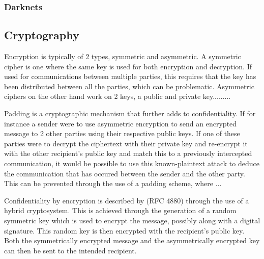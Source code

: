 		\subsubsection*{Darknets}
	\subsection{Cryptography}
		Encryption is typically of 2 types, symmetric and asymmetric. A symmetric cipher is one where the same key is used for both encryption and decryption. If used for communications between multiple parties, this requires that the key has been distributed between all the parties, which can be problematic. Asymmetric ciphers on the other hand work on 2 keys, a public and private key.........
		
		Padding is a cryptographic mechanism that further adds to confidentiality. If for instance a sender were to use asymmetric encryption to send an encrypted message to 2 other parties using their respective public keys. If one of these parties were to decrypt the ciphertext with their private key and re-encrypt it with the other recipient's public key and match this to a previously intercepted communication, it would be possible to use this known-plaintext attack to deduce the communication that has occured between the sender and the other party. This can be prevented through the use of a padding scheme, where ...
		
	
		Confidentiality by encryption is described by (RFC 4880)  through the use of a hybrid cryptosystem. This is achieved through the generation of a random symmetric key which is used to encrypt the message, possibly along with a digital signature. This random key is then encrypted with the recipient's public key. Both the symmetrically encrypted message and the asymmetrically encrypted key can then be sent to the intended recipient.
